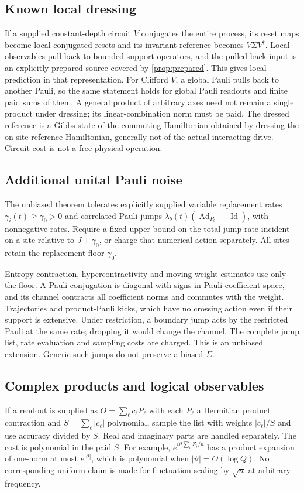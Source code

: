 \documentclass[11pt,reqno]{amsart}
\numberwithin{equation}{section}
\theoremstyle{definition}
\theoremstyle{remark}
\newcommand{\Id}{\operatorname{Id}}
\begin{document}
\subsection{Known local dressing}
If a supplied constant-depth circuit $V$ conjugates the entire process, its reset maps become local conjugated resets and its invariant reference becomes $V\Sigma V^\dagger$. Local observables pull back to bounded-support operators, and the pulled-back input is an explicitly prepared source covered by \cref{prop:prepared}. This gives local prediction in that representation. For Clifford $V$, a global Pauli pulls back to another Pauli, so the same statement holds for global Pauli readouts and finite paid sums of them. A general product of arbitrary axes need not remain a single product under dressing; its linear-combination norm must be paid. The dressed reference is a Gibbs state of the commuting Hamiltonian obtained by dressing the on-site reference Hamiltonian, generally not of the actual interacting drive. Circuit cost is not a free physical operation.

\subsection{Additional unital Pauli noise}
The unbiased theorem tolerates explicitly supplied variable replacement rates $\gamma_i(t)\geq\gamma_0>0$ and correlated Pauli jumps
$\lambda_b(t)(\operatorname{Ad}_{P_b}-\Id)$, with nonnegative rates. Require a fixed upper bound on the total jump rate incident on a site relative to $J+\gamma_0$, or charge that numerical action separately. All sites retain the replacement floor $\gamma_0$.

Entropy contraction, hypercontractivity and moving-weight estimates use only the floor. A Pauli conjugation is diagonal with signs in Pauli coefficient space, and its channel contracts all coefficient norms and commutes with the weight. Trajectories add product-Pauli kicks, which have no crossing action even if their support is extensive. Under restriction, a boundary jump acts by the restricted Pauli at the same rate; dropping it would change the channel. The complete jump list, rate evaluation and sampling costs are charged. This is an unbiased extension. Generic such jumps do not preserve a biased $\Sigma$.

\subsection{Complex products and logical observables}
If a readout is supplied as $O=\sum_\ell c_\ell P_\ell$ with each $P_\ell$ a Hermitian product contraction and $S=\sum_\ell|c_\ell|$ polynomial, sample the list with weights $|c_\ell|/S$ and use accuracy divided by $S$. Real and imaginary parts are handled separately. The cost is polynomial in the paid $S$. For example,
$e^{i\vartheta\sum_iZ_i/n}$ has a product expansion of one-norm at most $e^{|\vartheta|}$, which is polynomial when $|\vartheta|=O(\log Q)$. No corresponding uniform claim is made for fluctuation scaling by $\sqrt n$ at arbitrary frequency.
\end{document}
